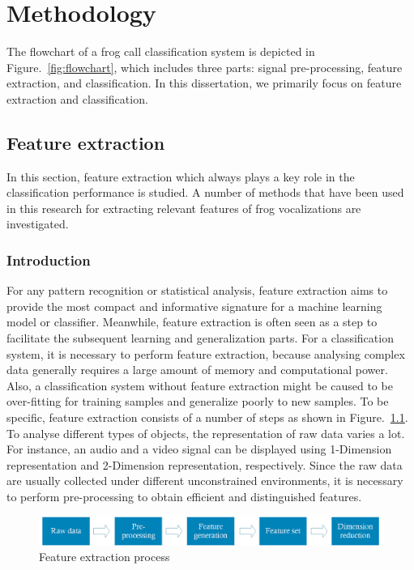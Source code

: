 
\chapter[Methodology]{Methodology}
\label{cha:cha3Method}

The flowchart of a frog call classification system is depicted in Figure.~\ref{fig:flowchart}, which includes three parts: signal pre-processing, feature extraction, and classification. In this dissertation, we primarily focus on feature extraction and classification.


\section{Feature extraction}

In this section, feature extraction which always plays a key role in the classification performance is studied. A number of methods that have been used in this research for extracting relevant features of frog vocalizations are investigated.

\subsection{Introduction}

For any pattern recognition or statistical analysis, feature extraction aims to provide the most compact and informative signature for a machine learning model or classifier. Meanwhile, feature extraction is often seen as a step to facilitate the subsequent learning and generalization parts. For a classification system, it is necessary to perform feature extraction, because analysing complex data generally requires a large amount of memory and computational power. Also, a classification system without feature extraction might be caused to be over-fitting for training samples and generalize poorly to new samples.  To be specific, feature extraction consists of a number of steps as shown in Figure.~\ref{fig:feature_extraction}. To analyse different types of objects, the representation of raw data varies a lot. For instance, an audio and a video signal can be displayed using 1-Dimension representation and 2-Dimension representation, respectively.  Since the raw data are usually collected under different unconstrained environments, it is necessary to perform pre-processing to obtain efficient and distinguished features.   


\begin{figure}[htb!]
\centering
\includegraphics[width=\textwidth]{image/feaeture_extraction.png}
\caption[Feature extraction process]{Feature extraction process}
\label{fig:feature_extraction}
\end{figure}

